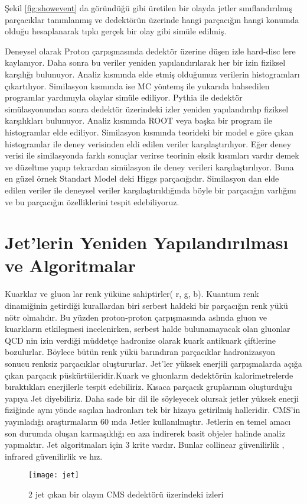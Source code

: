 Şekil \ref{fig:showevent} da göründüğü gibi üretilen bir olayda jetler sınıflandırılmış parçacıklar tanımlanmış ve dedektörün üzerinde hangi parçacığın hangi konumda olduğu hesaplanarak tıpkı gerçek bir olay gibi simüle edilmiş.
\par Deneysel olarak Proton çarpışmasında dedektör üzerine düşen izle hard-disc lere kaylanıyor. Daha sonra bu veriler yeniden yapılandırılarak her bir izin fiziksel karşılığı bulunuyor. Analiz kısmında elde etmiş olduğumuz verilerin histogramları çıkartılıyor. Similasyon kısmında ise MC yöntemş ile yukarıda bahsedilen programlar yardımıyla olaylar simüle ediliyor. Pythia ile dedektör simülasyonundan sonra dedektör üzerindeki izler yeniden yapılandırılıp fiziksel karşılıkları bulunuyor. Analiz kısmında ROOT veya başka bir program ile histogramlar elde ediliyor. Similasyon kısmında teorideki bir model e göre çıkan histogramlar ile deney verisinden eldi edilen veriler karşılaştırılıyor. Eğer deney verisi ile similasyonda farklı sonuçlar verirse teorinin eksik kısımları vardır demek ve düzeltme yapıp tekrardan simülasyon ile deney verileri karşılaştırılıyor. Buna en güzel örnek Standart Model deki Higgs parçacığıdır. Similasyon dan elde edilen veriler ile deneysel veriler karşılaştırıldığında böyle bir parçacığın varlığını ve bu parçacığın özelliklerini tespit edebiliyoruz.



\section{Jet'lerin Yeniden Yapılandırılması ve Algoritmalar}
Kuarklar ve gluon lar renk yüküne sahiptirler({\color{red} r},{\color{green} g},{\color{blue} b}). Kuantum renk dinamiğinin getirdiği kurallardan biri serbest haldeki bir parçacığın renk yükü nötr olmalıdır. Bu yüzden proton-proton çarpışmasında aslında gluon ve kuarkların etkileşmesi incelenirken, serbest halde bulunamayacak olan gluonlar QCD nin izin verdiği müddetçe hadronize olarak kuark antikuark çiftlerine bozulurlar. Böylece bütün renk yükü barındıran parçacıklar hadronizasyon sonucu renksiz parçacıklar oluştururlar.
Jet'ler yüksek enerjili çarpışmalarda açığa çıkan parçacık püskürtüleridir.Kuark ve gluonların dedektörün kalorimetrelerde bıraktıkları enerjilerle tespit edebiliriz. Kısaca parçacık gruplarının oluşturduğu yapıya Jet diyebiliriz. Daha sade bir dil ile söyleyecek olursak jetler yüksek enerji fiziğinde aynı yönde saçılan hadronları tek bir hizaya getirilmiş halleridir. CMS'in yayınladığı araştırmaların $60$ ında Jetler kullanılmıştır. Jetlerin en temel amacı son durumda oluşan karmaşıklığı en aza indirerek basit objeler halinde analiz yapmaktır. Jet algoritmaları için 3 krite vardır. Bunlar collinear güvenilirlik , infrared güvenilirlik ve hız.
\begin{figure}[!htbp]
\centering
\texttt{[image: jet]}
\caption{2 jet çıkan bir olayın CMS dedektörü üzerindeki izleri}
\label{fig:jet}
\end{figure}

